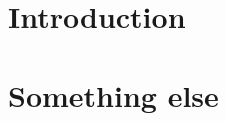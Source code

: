 \documentclass[a4paper,10pt,phdthesis,oneside,doublespace,pdflatex]{assets/latex/cssethesis}
\begin{document}
\begin{thesisabstract}
	
\end{thesisabstract}

\mainmatter


\glsresetall %
\chapter{Introduction}
\label{ch:chapter_1}


\glsresetall %
\chapter{Something else}
\label{ch:chapter_2}



\appendix %
\glsresetall %

%

\backmatter %

\pagestyle{plain}



\printglossary[type=\acronymtype,title={List of Acronyms}]

\listoffigures

\listoftables
\end{document}
